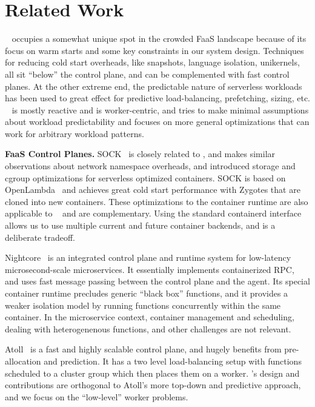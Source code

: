 \section{Related Work}
\label{sec:related}

\sysname~ occupies a somewhat unique spot in the crowded FaaS landscape because of its focus on warm starts and some key constraints in our system design.
%
Techniques for reducing cold start overheads, like snapshots, language isolation,  unikernels, all sit ``below'' the control plane, and can be complemented with fast control planes.
At the other extreme end, the predictable nature of serverless workloads has been used to great effect for predictive load-balancing, prefetching, sizing, etc.
\sysname~ is mostly reactive and is worker-centric, and tries to make minimal assumptions about workload predictability and focuses on more general optimizations that can work for arbitrary workload patterns.
%

\noindent \textbf{FaaS Control Planes.}
%
SOCK~\cite{oakes_sock_2018} is closely related to \sysname, and makes similar observations about network namespace overheads, and introduced storage and cgroup optimizations for serverless optimized containers. 
SOCK is based on OpenLambda~\cite{hendrickson2016serverless} and achieves great cold start performance with Zygotes that are cloned into new containers.
These optimizations to the container runtime are also applicable to \sysname~ and are complementary. 
Using the standard containerd interface allows us to use multiple current and future container backends, and is a deliberate tradeoff. 


Nightcore~\cite{jia2021nightcore} is an integrated control plane and runtime system for low-latency microsecond-scale microservices.
It essentially implements containerized RPC, and uses fast message passing between the control plane and the agent.
Its special container runtime precludes generic ``black box'' functions, and it provides a weaker isolation model by running functions concurrently within the same container.
In the microservice context, container management and scheduling, dealing with heterogenenous functions, and other challenges are not relevant.


Atoll~\cite{singhvi2021atoll} is a fast and highly scalable control plane, and hugely benefits from pre-allocation and prediction.
It has a two level load-balancing setup with functions scheduled to a cluster group which then places them on a worker. 
\sysname's design and contributions are orthogonal to Atoll's more top-down and predictive approach, and we focus on the ``low-level'' worker problems.


